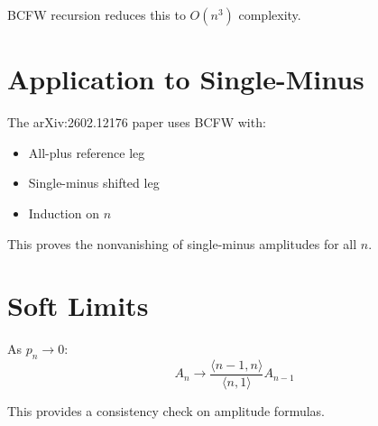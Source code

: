 BCFW recursion reduces this to $O(n^3)$ complexity.

\section{Application to Single-Minus}

The arXiv:2602.12176 paper uses BCFW with:
\begin{itemize}
\item All-plus reference leg
\item Single-minus shifted leg
\item Induction on $n$
\end{itemize}

This proves the nonvanishing of single-minus amplitudes for all $n$.

\section{Soft Limits}

As $p_n \to 0$:
\begin{equation}
A_n \to \frac{\langle n-1, n \rangle}{\langle n, 1 \rangle} A_{n-1}
\end{equation}

This provides a consistency check on amplitude formulas.
